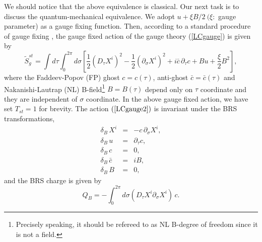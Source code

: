 \documentclass[12pt,a4paper]{article}
\newcommand{\ptau}{\partial_\tau}
\newcommand{\psig}{\partial_\sigma}
\newcommand{\brs}{\delta_B}
\begin{document}
We should notice that the above equivalence is classical.
Our next task is to discuss the quantum-mechanical equivalence.
We adopt  $u+\xi B/2~(\xi:$ gauge parameter) as a gauge fixing
function. Then, according to a standard procedure of gauge fixing
\cite{KU}, the gauge fixed action of the gauge theory (\ref{LCgauge})
is given by
\begin{equation}
 \tilde{S}_g^{st}=\int d\tau \int_0^{2\pi}d\sigma\left[
    \frac{1}{2}(D_{\tau} X^i)^2-\frac{1}{2}(\psig X^i)^2
    +i\bar{c}\,\ptau c + Bu +\frac{\xi}{2}B^2\right],\label{LCgauge2}
\end{equation}
where the Faddeev-Popov (FP) ghost $c=c(\tau)$, anti-ghost
$\bar{c}=\bar{c}(\tau)$ and  Nakanishi-Lautrap (NL)
B-field\footnote{Precisely speaking, it should be refereed to as NL
B-degree of freedom since it is not a field.} $B=B(\tau)$ depend only
on $\tau$ coordinate and they are independent of $\sigma$ coordinate.
In the above gauge fixed action, we have set $T_{st}=1$ for brevity.
The action $(\ref{LCgauge2})$ is invariant under the BRS
transformations,
\begin{eqnarray}
  \brs \,X^i &=& -c\,\psig X^i,\\
  \brs \,u&=& \ptau c,\\
  \brs \,c&=&0,\\
  \brs \,\bar{c}&=&iB,\\
  \brs \,B &=&0,
\end{eqnarray}
and the BRS charge is given by
\begin{equation}
 Q_B=-\int_0^{2\pi}d\sigma (D_{\tau}X^i\psig X^i)\,c.\label{BRS}
\end{equation}
\end{document}
